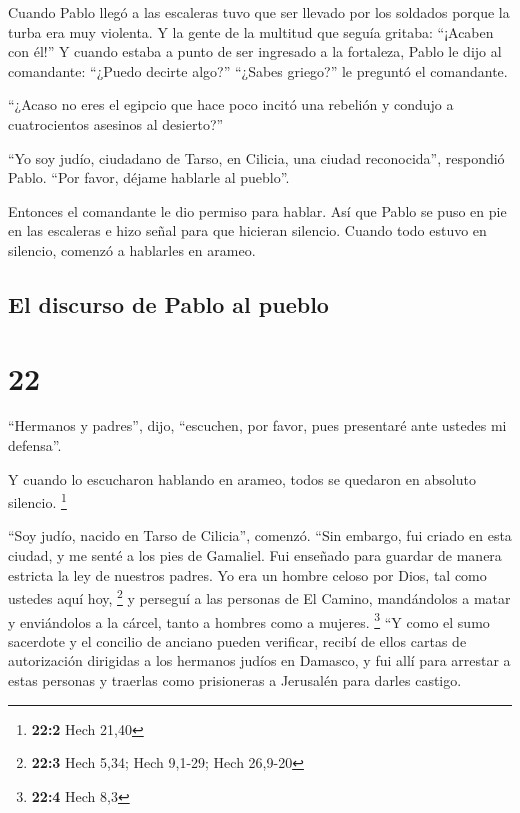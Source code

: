  Cuando Pablo llegó a las escaleras tuvo que ser llevado
por los soldados porque la turba era muy violenta.  Y la
gente de la multitud que seguía gritaba: ``¡Acaben con él!''
 Y cuando estaba a punto de ser ingresado a la fortaleza,
Pablo le dijo al comandante: ``¿Puedo decirte algo?'' ``¿Sabes griego?''
le preguntó el comandante.

 ``¿Acaso no eres el egipcio que hace poco incitó una
rebelión y condujo a cuatrocientos asesinos al desierto?''

 ``Yo soy judío, ciudadano de Tarso, en Cilicia, una
ciudad reconocida'', respondió Pablo. ``Por favor, déjame hablarle al
pueblo''.

 Entonces el comandante le dio permiso para hablar. Así
que Pablo se puso en pie en las escaleras e hizo señal para que hicieran
silencio. Cuando todo estuvo en silencio, comenzó a hablarles en arameo.

\hypertarget{el-discurso-de-pablo-al-pueblo}{%
\subsection{El discurso de Pablo al
pueblo}\label{el-discurso-de-pablo-al-pueblo}}

\hypertarget{section-21}{%
\section{22}\label{section-21}}

 ``Hermanos y padres'', dijo, ``escuchen, por favor, pues
presentaré ante ustedes mi defensa''.

 Y cuando lo escucharon hablando en arameo, todos se
quedaron en absoluto silencio. \footnote{\textbf{22:2} Hech 21,40}

 ``Soy judío, nacido en Tarso de Cilicia'', comenzó. ``Sin
embargo, fui criado en esta ciudad, y me senté a los pies de Gamaliel.
Fui enseñado para guardar de manera estricta la ley de nuestros padres.
Yo era un hombre celoso por Dios, tal como ustedes aquí hoy, \footnote{\textbf{22:3}
  Hech 5,34; Hech 9,1-29; Hech 26,9-20}  y perseguí a las
personas de El Camino, mandándolos a matar y enviándolos a la cárcel,
tanto a hombres como a mujeres. \footnote{\textbf{22:4} Hech 8,3}
 ``Y como el sumo sacerdote y el concilio de anciano
pueden verificar, recibí de ellos cartas de autorización dirigidas a los
hermanos judíos en Damasco, y fui allí para arrestar a estas personas y
traerlas como prisioneras a Jerusalén para darles castigo.

